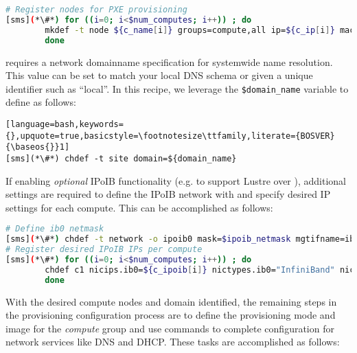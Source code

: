 \begin{lstlisting}[language=bash,keywords={},upquote=true,basicstyle=\footnotesize\ttfamily,]
# Register nodes for PXE provisioning 
[sms](*\#*) for ((i=0; i<$num_computes; i++)) ; do
		mkdef -t node ${c_name[i]} groups=compute,all ip=${c_ip[i]} mac=${c_mac[i]} netboot=pxe
        done
\end{lstlisting}

\noindent \xCAT{} requires a network domainname specification for systemwide name
resolution. This value can be set to match your local DNS schema or given a
unique identifier such as ``local''. In this recipe, we leverage the
\texttt{\$domain\_name} variable to define as follows:

\begin{lstlisting}[language=bash,keywords={},upquote=true,basicstyle=\footnotesize\ttfamily,literate={BOSVER}{\baseos{}}1]
[sms](*\#*) chdef -t site domain=${domain_name}
\end{lstlisting}

\clearpage
If enabling {\em optional} IPoIB functionality (e.g. to support Lustre over \InfiniBand{}), additional
settings are required to define the IPoIB network with \xCAT{} and specify
desired IP settings for each compute. This can be accomplished as follows:

\begin{lstlisting}[language=bash,keywords={},upquote=true,basicstyle=\footnotesize\ttfamily]
# Define ib0 netmask
[sms](*\#*) chdef -t network -o ipoib0 mask=$ipoib_netmask mgtifname=ib0
# Register desired IPoIB IPs per compute
[sms](*\#*) for ((i=0; i<$num_computes; i++)) ; do
		chdef c1 nicips.ib0=${c_ipoib[i]} nictypes.ib0="InfiniBand" nicnetworks.ib0=ib0
        done
\end{lstlisting}

With the desired compute nodes and domain identified, the remaining steps in the
provisioning configuration process are to define the provisioning mode and
image for the {\em compute} group and use \xCAT{} commands to complete
configuration for network services like DNS and DHCP. These tasks are
accomplished as follows:

